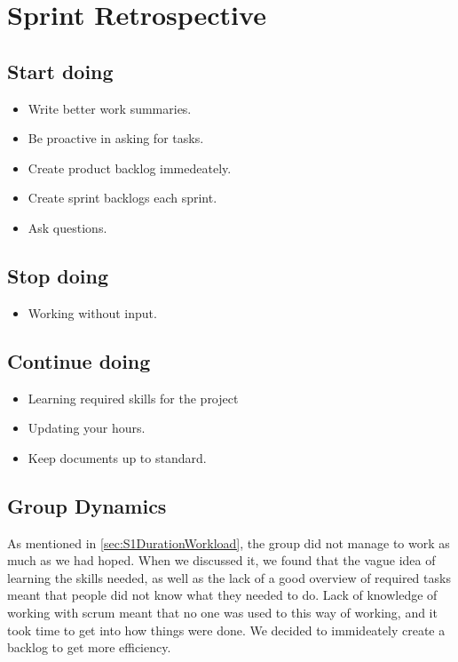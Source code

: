 \section{Sprint Retrospective}
\label{sec:S1Retrospective}

\subsection{Start doing}
\label{subsec:S1RetrospectiveStart}

\begin{itemize}
  \item Write better work summaries.
  \item Be proactive in asking for tasks.
  \item Create product backlog immedeately.
  \item Create sprint backlogs each sprint.
  \item Ask questions.
\end{itemize}

\subsection{Stop doing}
\label{subsec:S1RetrospectiveStop}

\begin{itemize}
  \item Working without input.
\end{itemize}

\subsection{Continue doing}
\label{subsec:S1RetrospectiveContinue}

\begin{itemize}
  \item Learning required skills for the project
  \item Updating your hours.
  \item Keep documents up to standard.
\end{itemize}

\subsection{Group Dynamics}
\label{subsec:S1RetrospectiveGroupDynamics}
As mentioned in \ref{sec:S1DurationWorkload}, the group did not manage to work as much as we had hoped. When we discussed it, we found that the vague idea of learning the skills needed, as well as the lack of a good overview of required tasks meant that people did not know what they needed to do. Lack of knowledge of working with scrum meant that no one was used to this way of working, and it took time to get into how things were done. We decided to immideately create a backlog to get more efficiency.

